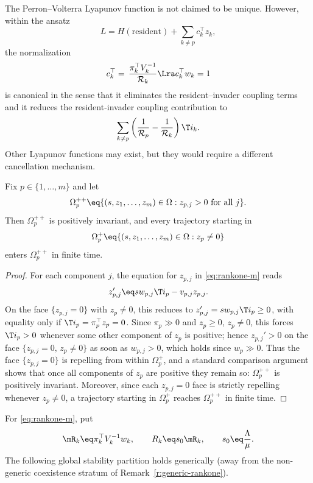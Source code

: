 The Perron--Volterra Lyapunov function is not claimed to be unique.
However, within the ansatz
\[
L
=
H(\text{resident})
+
\sum_{k\neq p}c_k^\top z_k,
\]
the normalization
\[
c_k^\top
=
\,\frac{\pi_k^\top V_k^{-1}}{\mathcal R_k} \Lra c_k^\top w_k=1
\]
is canonical in the sense that it  eliminates the resident--invader coupling terms and it
 reduces the resident-invader coupling contribution to
\[
\sum_{k\neq p}
\left(
\frac1{\mathcal R_p}
-
\frac1{\mathcal R_k}
\right)\T i_k.
\]
 Other Lyapunov functions may exist, but
they would require a different cancellation mechanism.
\eeR


Fix $p\in\{1,\ldots,m\}$ and let
\[
\Omega_p^{++}
\eq
\{(s,z_1,\ldots,z_m)\in\Omega : z_{p,j}>0 \text{ for all }j\}.
\]
Then $\Omega_p^{++}$ is positively invariant, and every trajectory
starting in
\[
\Omega_p^+\eq\{(s,z_1,\ldots,z_m)\in\Omega:z_p\ne0\}
\]
enters $\Omega_p^{++}$ in finite time.
\eeL

\begin{proof}
For each component $j$, the equation for $z_{p,j}$ in
\eqref{eq:rankone-m} reads
\[
z_{p,j}'
\eq
sw_{p,j}\T i_p-v_{p,j}z_{p,j}.
\]
On the face $\{z_{p,j}=0\}$ with $z_p\ne0$, this reduces to
$z_{p,j}'=sw_{p,j}\T i_p\ge0$, with equality only if $\T i_p=\pi_p^\top
z_p=0$.  Since $\pi_p\gg0$ and $z_p\ge0$, $z_p\ne0$, this forces
$\T i_p>0$ whenever some other component of $z_p$ is positive; hence
$z_{p,j}'>0$ on the face $\{z_{p,j}=0,\,z_p\ne0\}$ as soon as $w_{p,j}>0$,
which holds since $w_p\gg0$.  Thus the face $\{z_{p,j}=0\}$ is
repelling from within $\Omega_p^+$, and a standard comparison argument
shows that once all components of $z_p$ are positive they remain so:
$\Omega_p^{++}$ is positively invariant.  Moreover, since each
$z_{p,j}=0$ face is strictly repelling whenever $z_p\ne0$, a trajectory
starting in $\Omega_p^+$ reaches $\Omega_p^{++}$ in finite time.
\end{proof}


For \eqref{eq:rankone-m}, put
\[
\mR_k
\eq
\pi_k^\top V_k^{-1}w_k,
\qquad
R_k
\eq
s_0\mR_k,
\qquad
s_0
\eq
\frac{\Lambda}{\mu}.
\]
The following global stability partition holds generically (away from
the non-generic coexistence stratum of Remark~\ref{r:generic-rankone}).

\BEN

